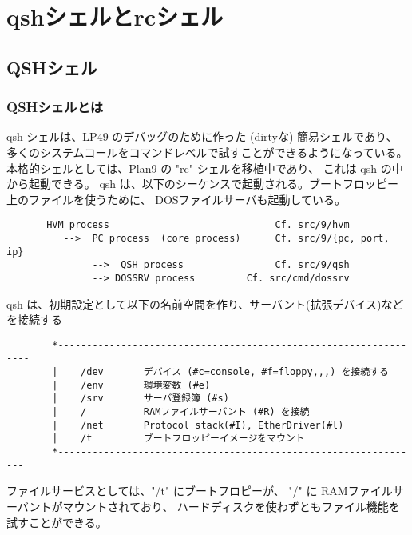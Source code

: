 \part{qshシェルとrcシェル}

\chapter{QSHシェル}

\section{QSHシェルとは}

      qsh シェルは、LP49 のデバッグのために作った (dirtyな) 簡易シェルであり、
      多くのシステムコールをコマンドレベルで試すことができるようになっている。
      本格的シェルとしては、Plan9 の "rc" シェルを移植中であり、
    これは qsh の中から起動できる。
      qsh は、以下のシーケンスで起動される。ブートフロッピー上のファイルを使うために、
      DOSファイルサーバも起動している。

\begin{verbatim}
       HVM process                             Cf. src/9/hvm
          -->  PC process  (core process)      Cf. src/9/{pc, port, ip}
               -->  QSH process                Cf. src/9/qsh
               --> DOSSRV process         Cf. src/cmd/dossrv
\end{verbatim}      

      qsh は、初期設定として以下の名前空間を作り、サーバント(拡張デバイス)などを接続する

\begin{verbatim}
        *-----------------------------------------------------------------
        |    /dev       デバイス (#c=console, #f=floppy,,,) を接続する     
        |    /env       環境変数 (#e)                                      
        |    /srv       サーバ登録簿 (#s)                                
        |    /          RAMファイルサーバント (#R) を接続                  
        |    /net       Protocol stack(#I), EtherDriver(#l)                
        |    /t         ブートフロッピーイメージをマウント                 
        *----------------------------------------------------------------
\end{verbatim}    
    
    ファイルサービスとしては、"/t" にブートフロピーが、
    "/" に RAMファイルサーバントがマウントされており、
    ハードディスクを使わずともファイル機能を試すことができる。

